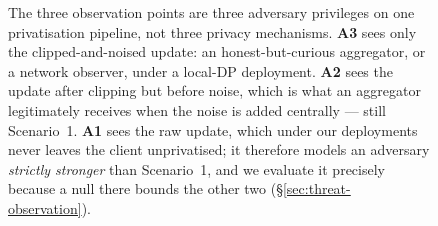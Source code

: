 \begin{figure}[t]
\begin{tikzpicture}
\end{tikzpicture}
\caption{The three observation points are three adversary privileges on one
privatisation pipeline, not three privacy mechanisms. \textbf{A3} sees only
the clipped-and-noised update: an honest-but-curious aggregator, or a network
observer, under a local-DP deployment. \textbf{A2} sees the update after
clipping but before noise, which is what an aggregator legitimately receives
when the noise is added centrally --- still Scenario~1. \textbf{A1} sees the
raw update, which under our deployments never leaves the client
unprivatised; it therefore models an adversary \emph{strictly stronger} than
Scenario~1, and we evaluate it precisely because a null there bounds the
other two (\S\ref{sec:threat-observation}).}
\label{fig:adversary-points}
\end{figure}
